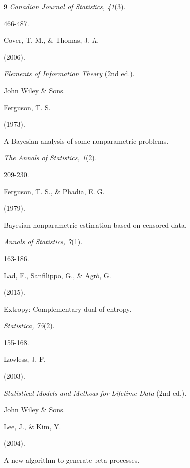 \documentclass[10pt,twoside]{article}
\numberwithin{equation}{section}
\begin{document}
\begin{thebibliography}{9}
\textit{Canadian Journal of Statistics, 41}(3).

466-487. 



Cover, T. M., \& Thomas, J. A. 

(2006).

\textit{Elements of Information Theory} (2nd ed.).

John Wiley \& Sons. 



Ferguson, T. S. 

(1973). 

A Bayesian analysis of some nonparametric problems.

\textit{The Annals of Statistics, 1}(2).

209-230.  



Ferguson, T. S., \& Phadia, E. G. 

(1979). 

Bayesian nonparametric estimation based on censored data. 

\textit{Annals of Statistics, 7}(1).

163-186.  



Lad, F., Sanfilippo, G., \& Agrò, G. 

(2015). 

Extropy: Complementary dual of entropy. 

\textit{Statistica, 75}(2).

155-168. 



Lawless, J. F. 

(2003). 

\textit{Statistical Models and Methods for Lifetime Data} (2nd ed.).

John Wiley \& Sons.  



Lee, J., \& Kim, Y. 

(2004). 

A new algorithm to generate beta processes. 


\end{thebibliography}
\end{document}
